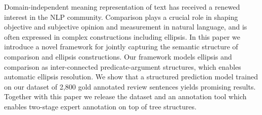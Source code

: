 Domain-independent meaning representation of text has received a renewed interest in the NLP community. Comparison plays a crucial role in shaping objective and subjective opinion and measurement in natural language, and is often expressed in complex constructions including ellipsis. In this paper we introduce a novel framework for jointly capturing the semantic structure of comparison and ellipsis constructions. Our framework models ellipsis and comparison as inter-connected predicate-argument structures, which enables automatic ellipsis resolution. We show that a structured prediction model trained on our dataset of 2,800 gold annotated review sentences yields promising results. Together with this paper we release the dataset and an annotation tool which enables two-stage expert annotation on top of tree structures.
